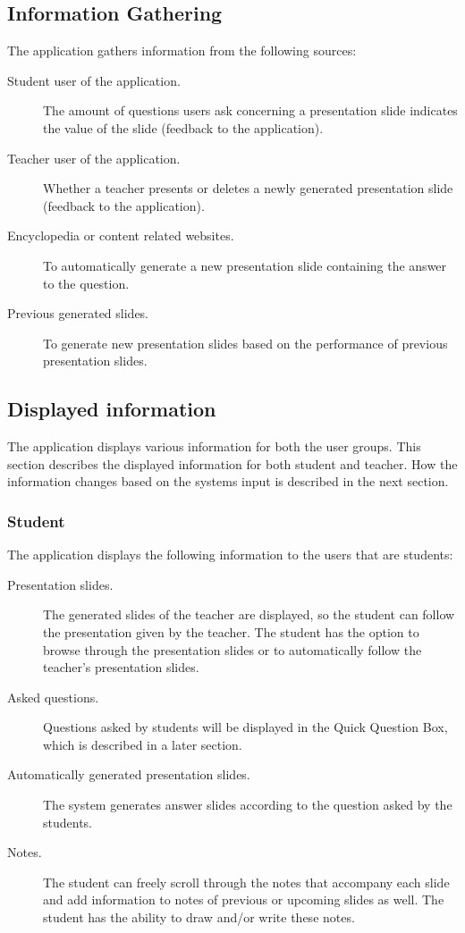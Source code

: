 \documentclass[11pt]{article}
\begin{document}
\subsection{Information Gathering}
The application gathers information from the following sources:
\begin{description}
\item[Student user of the application.] The amount of questions users ask concerning a presentation slide indicates the value of the slide (feedback to the application).
\item[Teacher user of the application.] Whether a teacher presents or deletes a newly generated presentation slide (feedback to the application).
\item[Encyclopedia or content related websites.] To automatically generate a new presentation slide containing the answer to the question.
\item[Previous generated slides.] To generate new presentation slides based on the performance of previous presentation slides.
\end{description}

\subsection{Displayed information}
The application displays various information for both the user groups. This section describes the displayed information for both student and teacher. How the information changes based on the systems input is described in the next section. 
\subsubsection{Student}
The application displays the following information to the users that are students:
\begin{description}
\item[Presentation slides.] The generated slides of the teacher are displayed, so the student can follow the presentation given by the teacher. The student has the option to browse through the presentation slides or to automatically follow the teacher's presentation slides.
\item[Asked questions.] Questions asked by students will be displayed in the Quick Question Box, which is described in a later section. %
\item[Automatically generated presentation slides.] The system generates answer slides according to the question asked by the students.
\item[Notes.] The student can freely scroll through the notes that accompany each slide and add information to notes of previous or upcoming slides as well. The student has the ability to draw and/or write these notes.
\end{description}
\end{document}
